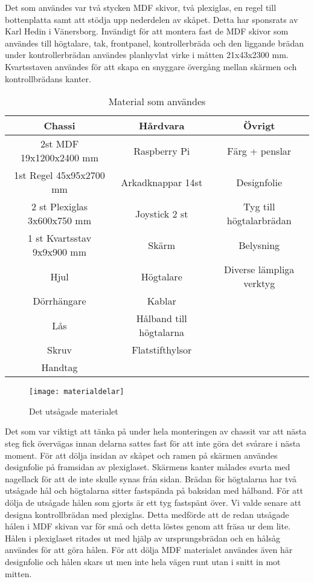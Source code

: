 \documentclass[12pt,fleqn,openany]{book} %
\begin{document}
\bigskip
Det som användes var två stycken MDF skivor, två plexiglas, en regel till bottenplatta samt att stödja upp nederdelen av skåpet. 
Detta har sponsrats av Karl Hedin i Vänersborg. Invändigt för att montera fast de MDF skivor som användes till högtalare, tak, 
frontpanel, kontrollerbräda och den liggande brädan under kontrollerbrädan användes planhyvlat virke i måtten 21x43x2300 mm. 
Kvartsstaven användes för att skapa en snyggare övergång mellan skärmen och kontrollbrädans kanter.

\begin{table}[h!]
\centering
\begin{tabular}{ ||c|c|c|| } 
 \hline
 Chassi & Hårdvara & Övrigt \\ [0.5ex]
 \hline\hline
 2st MDF 19x1200x2400 mm & Raspberry Pi & Färg + penslar \\ 
 1st Regel 45x95x2700 mm & Arkadknappar 14st & Designfolie \\ 
 2 st Plexiglas 3x600x750 mm & Joystick 2 st & Tyg till högtalarbrädan \\
 1 st Kvartsstav 9x9x900 mm & Skärm & Belysning \\
 Hjul & Högtalare & Diverse lämpliga verktyg \\
 Dörrhängare & Kablar & \\
 Lås & Hålband till högtalarna & \\
 Skruv & Flatstifthylsor & \\
 Handtag & & \\
 \hline
\end{tabular}
\caption{Material som användes}
\label{table_material}
\end{table}

\begin{wrapfigure}{R}{0.35\textwidth}
  \begin{center}
    \texttt{[image: materialdelar]}
  \end{center}
  \caption{Det utsågade materialet}
  \label{fig_material}
\end{wrapfigure}
Det som var viktigt att tänka på under hela monteringen av chassit var att nästa steg fick övervägas innan delarna sattes fast 
för att inte göra det svårare i nästa moment. För att dölja insidan av skåpet och ramen på skärmen användes designfolie på 
framsidan av plexiglaset. Skärmens kanter målades svarta med nagellack för att de inte skulle synas från sidan. Brädan för 
högtalarna har två utsågade hål och högtalarna sitter fastspända på baksidan med hålband. För att dölja de utsågade hålen 
som gjorts är ett tyg fastspänt över. Vi valde senare att designa kontrollbrädan med plexiglas. Detta medförde att de redan 
utsågade hålen i MDF skivan var för små och detta löstes genom att fräsa ur dem lite. Hålen i plexiglaset ritades ut med hjälp 
av ursprungsbrädan och en hålsåg användes för att göra hålen. För att dölja MDF materialet användes även här designfolie och 
hålen skars ut men inte hela vägen runt utan i snitt in mot mitten.
\end{document}
